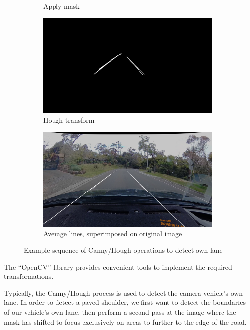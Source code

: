 \documentclass[11pt,twoside]{report}
\begin{document}
\begin{figure}[h]
\begin{subfigure}{0.3\textwidth}
	\caption{Apply mask}
\end{subfigure}
\hfill
\begin{subfigure}{0.3\textwidth}
	\includegraphics[width=\textwidth]{f009_hough.png}
	\caption{Hough transform}
\end{subfigure}
\hfill
\begin{subfigure}{0.3\textwidth}
	\includegraphics[width=\textwidth]{f009_own_lane.png}
	\caption{Average lines, superimposed on original image}
\end{subfigure}
\caption{Example sequence of Canny/Hough operations to detect own lane}
\label{fig:009}
\end{figure}

The ``OpenCV'' library provides convenient tools to implement the required transformations.

Typically, the Canny/Hough process is used to detect the camera vehicle's own lane.  In order to detect a paved shoulder, we first want to detect the boundaries of our vehicle's own lane, then perform a second pass at the image where the mask has shifted to focus exclusively on areas to further to the edge of the road.
\end{document}
